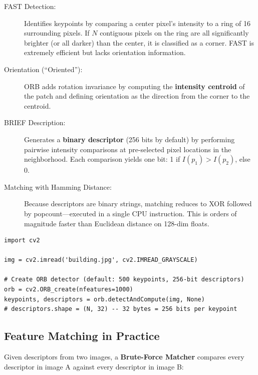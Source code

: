 \begin{description}
    \item[FAST Detection:] Identifies keypoints by comparing a center pixel's intensity to a ring of 16 surrounding pixels. If $N$ contiguous pixels on the ring are all significantly brighter (or all darker) than the center, it is classified as a corner. FAST is extremely efficient but lacks orientation information.
    \item[Orientation (``Oriented''):] ORB adds rotation invariance by computing the \textbf{intensity centroid} of the patch and defining orientation as the direction from the corner to the centroid.
    \item[BRIEF Description:] Generates a \textbf{binary descriptor} (256 bits by default) by performing pairwise intensity comparisons at pre-selected pixel locations in the neighborhood. Each comparison yields one bit: 1 if $I(p_1) > I(p_2)$, else 0.
    \item[Matching with Hamming Distance:] Because descriptors are binary strings, matching reduces to XOR followed by popcount---executed in a single CPU instruction. This is orders of magnitude faster than Euclidean distance on 128-dim floats.
\end{description}

\begin{lstlisting}[style=pythonstyle]
import cv2

img = cv2.imread('building.jpg', cv2.IMREAD_GRAYSCALE)

# Create ORB detector (default: 500 keypoints, 256-bit descriptors)
orb = cv2.ORB_create(nfeatures=1000)
keypoints, descriptors = orb.detectAndCompute(img, None)
# descriptors.shape = (N, 32) -- 32 bytes = 256 bits per keypoint
\end{lstlisting}

\subsection*{Feature Matching in Practice}

Given descriptors from two images, a \textbf{Brute-Force Matcher} compares every descriptor in image A against every descriptor in image B:

